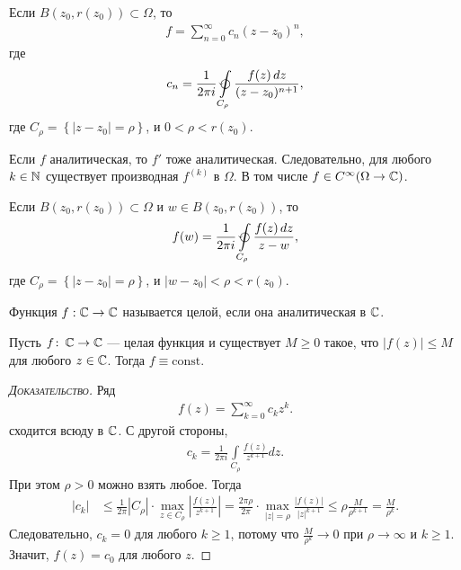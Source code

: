 \documentclass[../complex-analysis.tex]{subfiles}
\begin{document}
\begin{crly}
 Если $ B(z_0, r(z_0)) \subset \Omega $, то
 \begin{align*}
  f = \sum_{n=0}^{\infty}c_n(z-z_0)^{n},
 \end{align*} где
 \begin{align*}
  c_n = \frac{1}{2\pi i} \varointctrclockwise\limits_{C_\rho} \frac{f(z)\,dz}{(z-z_0)^{n+1}},
 \end{align*} где $ C_\rho = \left\{ \left| z-z_0 \right| = \rho \right\} $, и $ 0 < \rho < r(z_0) $.
\end{crly}
\begin{crly}
 Если $ f $ аналитическая, то $ f' $ тоже аналитическая. Следовательно, для любого $ k \in \mathbb{N} $ существует производная $ f^{(k)} $ в $ \Omega $. В том числе $ f \in C^{\infty}(\Omega \to \mathbb{C}) $.
\end{crly}
\begin{crly}
 Если $ B(z_0, r(z_0)) \subset \Omega $ и $ w \in B(z_0,r(z_0)) $, то
 \begin{align*}
  f(w) = \frac{1}{2\pi i} \varointctrclockwise\limits_{C_\rho} \frac{f(z)\,dz}{z - w},
 \end{align*} где $ C_\rho = \left\{ \left| z-z_0 \right| = \rho \right\} $, и $ \left| w - z_0 \right| < \rho < r(z_0) $.
\end{crly}

\begin{df}
	Функция $f: \mathbb{C} \to \mathbb{C}$ называется целой, если она аналитическая в $\mathbb{C}$.
\end{df}
\begin{thm}[Лиувилля]
 \label{theorem:liuvill}
 Пусть $ f \colon\, \mathbb{C} \to \mathbb{C} $ --- целая функция и существует $ M \geq 0 $ такое, что $ \left| f(z) \right| \leqslant M $ для любого $ z \in \mathbb{C} $. Тогда $ f \equiv \mathrm{const} $.
\end{thm}
\begin{proof}[\normalfont\textsc{Доказательство}]
 Ряд
 \begin{align*}
  f(z) = \sum_{k=0}^{\infty} c_k z^{k}.
 \end{align*} сходится всюду в $ \mathbb{C} $. С другой стороны,
 \begin{align*}
  c_k = \frac{1}{2\pi i} \int\limits_{C_\rho} \frac{f(z)}{z^{k+1}} dz.
 \end{align*} При этом $ \rho > 0 $ можно взять любое. Тогда
 \begin{align*}
  \left| c_k \right| &\leqslant \frac{1}{2\pi} \left| C_\rho \right| \cdot \max_{z \in C_\rho} \left| \frac{f(z)}{z^{k+1}} \right| = \frac{2\pi \rho}{2\pi}  \cdot \max_{\left| z \right|=\rho} \frac{\left| f(z) \right|}{\left| z \right|^{k+1}} \leqslant \rho \frac{M}{\rho^{k+1}} = \frac{M}{\rho^{k}}.
 \end{align*} Следовательно, $ c_k = 0 $ для любого $ k \geqslant 1 $, потому что $ \frac{M}{\rho^{k}} \to 0 $ при $ \rho \to \infty $ и $ k \geqslant 1 $. Значит, $ f(z) = c_0 $ для любого $ z $.
\end{proof}
\end{document}
